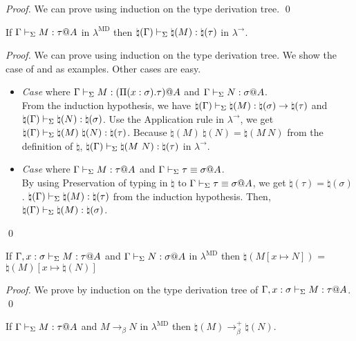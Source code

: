 \begin{proof}
	We can prove using induction on the type derivation tree.
\qed\end{proof}
	
\begin{lemma}
	If $\G \V M:\tau@A$ in $\lambda^{\text{MD}}$ then $\natural(\Gamma) \vdash_\Sigma \natural(M): \natural(\tau)$ in $\lambda^\to$.
\end{lemma}

\begin{proof}
	We can prove using induction on the type derivation tree.
	We show the case of \TApp{} and \TConv{} as examples.
	Other cases are easy.
\begin{itemize}
	\item \textit{Case} \TApp{} where $\Gamma \vdash_\Sigma M : (\Pi(x:\sigma).\tau) @ A$ and $\Gamma \vdash_\Sigma N :\sigma @A$.\\
	      From the induction hypothesis, we have $\natural(\Gamma) \vdash_\Sigma \natural(M) : \natural(\sigma) \to \natural(\tau)$ and $\natural(\Gamma) \vdash_\Sigma \natural(N) : \natural(\sigma)$.
	      Use the Application rule in $\lambda^\to$, we get $\natural(\G) \V \natural(M)\ \natural(N) : \natural(\tau)$.
	      Because $\natural(M)\ \natural(N) = \natural(M\ N)$ from the definition of $\natural$, $\natural(\Gamma) \vdash_\Sigma \natural(M\ N) : \natural(\tau)$ in $\lambda^\to$.
	\item \textit{Case} \TConv{} where $\G\V M:\tau@A$ and $\G\V \tau\E\sigma@A$.\\
	      By using Preservation of typing in $\natural$ to $\G\V \tau\E\sigma@A$, we get $\natural(\tau) = \natural(\sigma)$.
	      $\natural(\Gamma) \vdash_\Sigma \natural(M):\natural(\tau)$ from the induction hypothesis.
	      Then, $\natural(\Gamma) \vdash_\Sigma \natural(M):\natural(\sigma)$.
\end{itemize}
\qed\end{proof}

\begin{lemma}
	If $\G, x:\sigma \V M:\tau@A$ and $\G \V N:\sigma@A$ in $\lambda^{\text{MD}}$
	then $\natural(M[x \mapsto N])$ = $\natural(M)[x\mapsto\natural(N)]$
\end{lemma}

\begin{proof}
We prove by induction on the type derivation tree of $\G, x:\sigma \V M:\tau@A$.
\qed\end{proof}
	
\begin{lemma}
	If $\G \V M:\tau@A$ and $M \longrightarrow_\beta N$ in $\lambda^{\text{MD}}$
	then $\natural(M) \longrightarrow_\beta^+ \natural(N)$.
\end{lemma}

